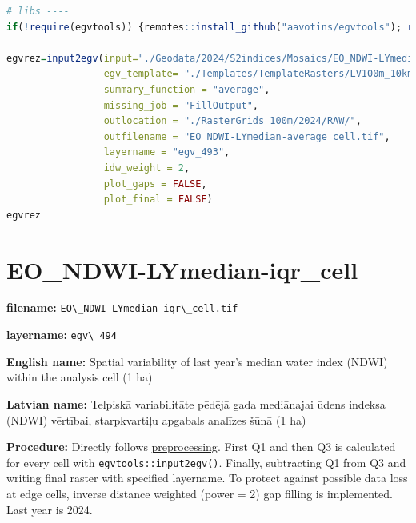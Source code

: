 \documentclass[
]{book}
\newcommand{\passthrough}[1]{#1}
\begin{document}
\begin{lstlisting}[language=R]
# libs ----
if(!require(egvtools)) {remotes::install_github("aavotins/egvtools"); require(egvtools)}

egvrez=input2egv(input="./Geodata/2024/S2indices/Mosaics/EO_NDWI-LYmedian.tif",
                 egv_template= "./Templates/TemplateRasters/LV100m_10km.tif",
                 summary_function = "average",
                 missing_job = "FillOutput",
                 outlocation = "./RasterGrids_100m/2024/RAW/",
                 outfilename = "EO_NDWI-LYmedian-average_cell.tif",
                 layername = "egv_493",
                 idw_weight = 2,
                 plot_gaps = FALSE,
                 plot_final = FALSE)
egvrez
\end{lstlisting}

\section{EO\_NDWI-LYmedian-iqr\_cell}\label{ch06.494}

\textbf{filename:} \passthrough{\lstinline!EO\_NDWI-LYmedian-iqr\_cell.tif!}

\textbf{layername:} \passthrough{\lstinline!egv\_494!}

\textbf{English name:} Spatial variability of last year's median water index (NDWI) within the analysis cell (1 ha)

\textbf{Latvian name:} Telpiskā variabilitāte pēdējā gada mediānajai ūdens indeksa (NDWI) vērtībai, starpkvartiļu apgabals analīzes šūnā (1 ha)

\textbf{Procedure:} Directly follows \hyperref[Ch04.13]{preprocessing}. First Q1 and then Q3
is calculated for every cell with \passthrough{\lstinline!egvtools::input2egv()!}. Finally, subtracting
Q1 from Q3 and writing final raster with specified layername. To protect against possible data loss at edge cells,
inverse distance weighted (power = 2) gap filling is implemented. Last year is 2024.
\end{document}
